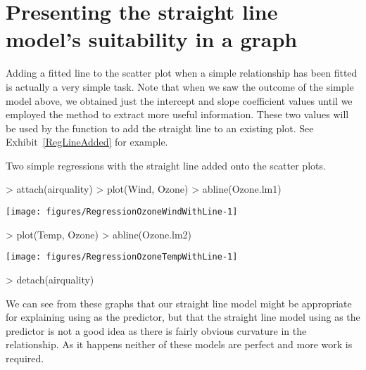  
 
 
\section{Presenting the straight line model's suitability in a graph} 
\label{AddFittedLine} 
 
Adding a fitted line to the scatter plot when a simple relationship has been fitted is actually a very simple task. Note that when we saw the outcome of the simple model above, we obtained just the intercept and slope coefficient values until we employed the  method to extract more useful information. These two values will be used by the  function to add the straight line to an existing plot. See Exhibit~\ref{RegLineAdded} for example. 
\begin{exhibit} 
\begin{center} 
\caption{Two simple regressions with the straight line added onto the scatter plots.} 
\label{RegLineAdded} 

\begin{Schunk}
\begin{Sinput}
> attach(airquality) 
> plot(Wind, Ozone) 
> abline(Ozone.lm1) 
\end{Sinput}

\texttt{[image: figures/RegressionOzoneWindWithLine-1]} \end{Schunk}

\begin{Schunk}
\begin{Sinput}
> plot(Temp, Ozone) 
> abline(Ozone.lm2) 
\end{Sinput}

\texttt{[image: figures/RegressionOzoneTempWithLine-1]} \begin{Sinput}
> detach(airquality) 
\end{Sinput}
\end{Schunk}

\end{center} 
\end{exhibit} 
 
We can see from these graphs that our straight line model might be appropriate for explaining  using  as the predictor, but that the straight line model using  as the predictor is not a good idea as there is fairly obvious curvature in the relationship. As it happens neither of these models are perfect and more work is required. 
 
